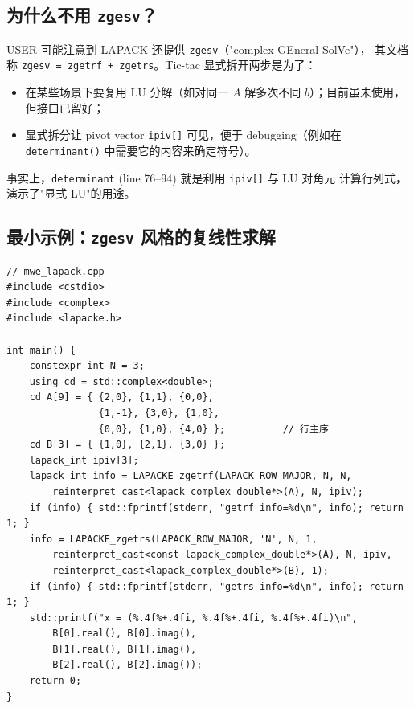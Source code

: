 \subsection{为什么不用 \texttt{zgesv}？}

USER 可能注意到 LAPACK 还提供 \texttt{zgesv}（"complex GEneral SolVe"），
其文档称 \texttt{zgesv = zgetrf + zgetrs}。Tic-tac 显式拆开两步是为了：
\begin{itemize}
\item 在某些场景下要复用 LU 分解（如对同一 $A$ 解多次不同 $b$）；目前虽未使用，
      但接口已留好；
\item 显式拆分让 pivot vector \texttt{ipiv[]} 可见，便于 debugging（例如在
      \texttt{determinant()} 中需要它的内容来确定符号）。
\end{itemize}
事实上，\texttt{determinant} (line 76--94) 就是利用 \texttt{ipiv[]} 与 LU 对角元
计算行列式，演示了"显式 LU"的用途。

\subsection{最小示例：\texttt{zgesv} 风格的复线性求解}

\begin{lstlisting}[style=cpp,caption={LAPACK 复双精度稠密线性求解最小示例。}]
// mwe_lapack.cpp
#include <cstdio>
#include <complex>
#include <lapacke.h>

int main() {
    constexpr int N = 3;
    using cd = std::complex<double>;
    cd A[9] = { {2,0}, {1,1}, {0,0},
                {1,-1}, {3,0}, {1,0},
                {0,0}, {1,0}, {4,0} };          // 行主序
    cd B[3] = { {1,0}, {2,1}, {3,0} };
    lapack_int ipiv[3];
    lapack_int info = LAPACKE_zgetrf(LAPACK_ROW_MAJOR, N, N,
        reinterpret_cast<lapack_complex_double*>(A), N, ipiv);
    if (info) { std::fprintf(stderr, "getrf info=%d\n", info); return 1; }
    info = LAPACKE_zgetrs(LAPACK_ROW_MAJOR, 'N', N, 1,
        reinterpret_cast<const lapack_complex_double*>(A), N, ipiv,
        reinterpret_cast<lapack_complex_double*>(B), 1);
    if (info) { std::fprintf(stderr, "getrs info=%d\n", info); return 1; }
    std::printf("x = (%.4f%+.4fi, %.4f%+.4fi, %.4f%+.4fi)\n",
        B[0].real(), B[0].imag(),
        B[1].real(), B[1].imag(),
        B[2].real(), B[2].imag());
    return 0;
}
\end{lstlisting}

